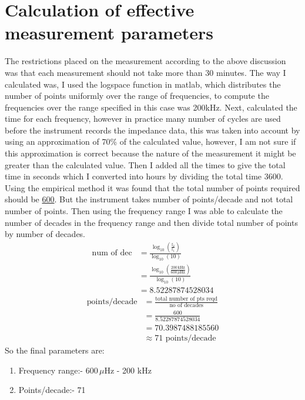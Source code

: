 \documentclass[12pt]{book}
\begin{document}
\section{Calculation of effective measurement parameters}
The restrictions placed on the measurement according to the above discussion was that each measurement should not take more than 30 minutes. The way I calculated was, I used the logspace function in matlab, which distributes the number of points uniformly over the range of frequencies, to compute the frequencies over the range specified in this case was 200kHz. Next, calculated the time for each frequency, however in practice many number of cycles are used before the instrument records the impedance data, this was taken into account by using an approximation of 70\% of the calculated value, however, I am not sure if this approximation is correct because the nature of the measurement it might be greater than the calculated value. Then I added all the times to give the total time in seconds which I converted into hours by dividing the total time 3600. Using the empirical method it was found that the total number of points required should be \underline{600}. But the instrument takes number of points/decade and not total number of points. Then using the frequency range I was able to calculate the number of decades in the frequency range and then divide total number of points by number of decades.
\begin{align}
\textrm{num of dec}&=\frac{\log_{10}\left(\frac{\textrm{f}_2}{\textrm{f}_1}\right)}{\log_{10}\left({10}\right)}\\
&=\frac{\log_{10}\left(\frac{200\,\textrm{kHz}}{600\,\mu\textrm{Hz}}\right)}{\log_{10}\left({10}\right)}\nonumber\\
&=8.52287874528034\nonumber
\end{align}
\begin{align}
\textrm{points/decade}&=\frac{\textrm{total number of pts reqd}}{\textrm{no of decades}}\\
&=\frac{\textrm{600}}{\textrm{8.52287874528034}}\nonumber\\
&=70.3987488185560\nonumber\\
&\approx 71 \textrm{ points/decade}\nonumber
\end{align}
So the final parameters are:
\begin{enumerate}
\item[] Frequency range:- 600$\,\mu$Hz - 200 kHz
\item[] Points/decade:- 71
\end{enumerate}
\end{document}
